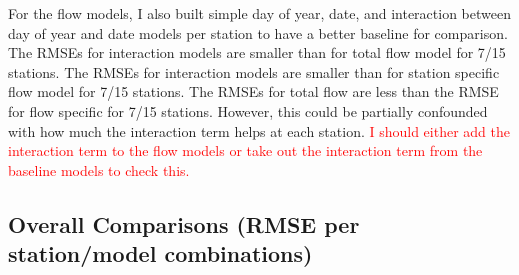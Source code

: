 \documentclass[12pt]{amsart}
\begin{document}

For the flow models, I also built simple day of year, date, and interaction between day of year and date models per station to have a better baseline for comparison.
The RMSEs for interaction models are smaller than for total flow model for 7/15 stations. The RMSEs for interaction models are smaller than for station specific flow model for 7/15 stations.  The RMSEs for total flow are less than the RMSE for flow specific for 7/15 stations.  However, this could be partially confounded with how much the interaction term helps at each station. \textcolor{red}{I should either add the interaction term to the flow models or take out the interaction term from the baseline models to check this.}

\subsection{Overall Comparisons (RMSE per station/model combinations)}
\end{document}
